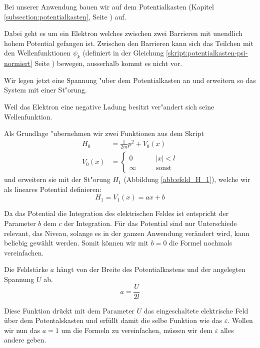 \begin{refsection}
Bei unserer Anwendung bauen wir auf dem Potentialkasten (Kapitel \ref{subsection:potentialkasten}, Seite \pageref{subsection:potentialkasten}) auf.

Dabei geht es um ein Elektron welches zwischen zwei Barrieren mit unendlich hohem Potential gefangen ist.
Zwischen den Barrieren kann sich das Teilchen mit den Wellenfunktionen $\psi_k$ 
(definiert in der Gleichung \ref{skript:potentialkasten-psi-normiert} Seite \pageref{skript:potentialkasten-psi-normiert}) bewegen,
ausserhalb kommt es nicht vor.

Wir legen jetzt eine Spannung "uber dem Potentialkasten an
und erweitern so das System mit einer St"orung.

Weil das Elektron eine negative Ladung besitzt ver"andert sich seine Wellenfunktion.

Als Grundlage "ubernehmen wir zwei Funktionen aus dem Skript
\begin{equation}
\begin{aligned}
H_0&=\frac1{2m}p^2+V_0(x)
\\
V_0(x)&=
  \begin{cases}
    0       & \qquad |x|<l\\
    \infty  & \qquad\text{sonst}
  \end{cases}
\end{aligned}
\end{equation}
und erweitern sie mit der St"orung $H_1$ (Abbildung \ref{abb:efeld_H_1}), welche wir als lineares 
Potential definieren:
\begin{equation}
  H_1 = V_1(x) = a x + b
\end{equation}


Da das Potential die Integration des elektrischen Feldes ist entspricht der Parameter $b$ dem $c$ der Integration.
F\"ur das Potential sind nur Unterschiede relevant, das Niveau, solange es in der ganzen Anwendung ver\"andert wird,
kann beliebig gew\"ahlt werden. Somit k\"onnen wir mit $b=0$ die Formel nochmals vereinfachen.

Die Feldst\"arke $a$ h\"angt von der Breite des Potentialkastens und der angelegten Spannung $U$ ab.
\[
  a = \frac{ U }{2 l}
\]

Diese Funktion dr\"uckt mit dem Parameter $U$ das eingeschaltete elektrische Feld \"uber dem Potentalskasten
und erf\"ullt damit die selbe Funktion wie das $\varepsilon$.
Wollen wir nun das $a = 1$ um die Formeln zu vereinfachen, m\"ussen wir dem $\varepsilon$ alles andere geben.


\end{refsection}
